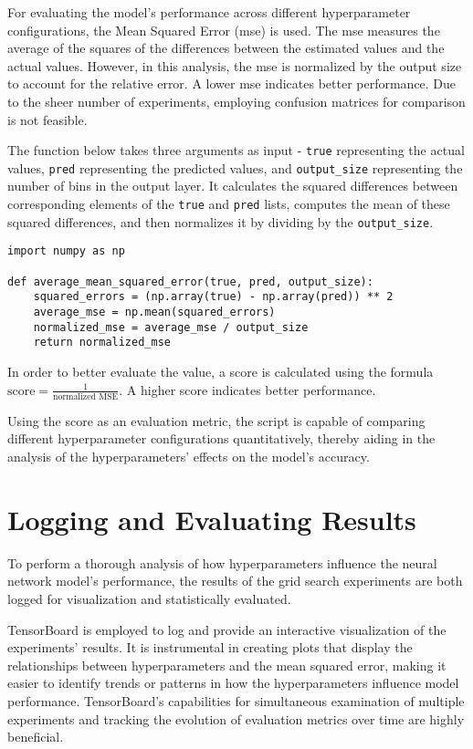 For evaluating the model's performance across different hyperparameter configurations, the Mean Squared Error (\ac{mse}) is used. The \ac{mse} measures the average of the squares of the differences between the estimated values and the actual values. However, in this analysis, the \ac{mse} is normalized by the output size to account for the relative error. A lower \ac{mse} indicates better performance. Due to the sheer number of experiments, employing confusion matrices for comparison is not feasible.

The function below takes three arguments as input - \verb|true| representing the actual values, \verb|pred| representing the predicted values, and \verb|output_size| representing the number of bins in the output layer. It calculates the squared differences between corresponding elements of the \verb|true| and \verb|pred| lists, computes the mean of these squared differences, and then normalizes it by dividing by the \verb|output_size|.

\begin{verbatim}
import numpy as np

def average_mean_squared_error(true, pred, output_size):
    squared_errors = (np.array(true) - np.array(pred)) ** 2
    average_mse = np.mean(squared_errors)
    normalized_mse = average_mse / output_size
    return normalized_mse
\end{verbatim}

In order to better evaluate the value, a score is calculated using the formula $\text{score} = \frac{1}{\text{normalized MSE}}$. A higher score indicates better performance.

Using the score as an evaluation metric, the script is capable of comparing different hyperparameter configurations quantitatively, thereby aiding in the analysis of the hyperparameters' effects on the model's accuracy.


\section{Logging and Evaluating Results}

To perform a thorough analysis of how hyperparameters influence the neural network model's performance, the results of the grid search experiments are both logged for visualization and statistically evaluated.

TensorBoard is employed to log and provide an interactive visualization of the experiments' results. It is instrumental in creating plots that display the relationships between hyperparameters and the mean squared error, making it easier to identify trends or patterns in how the hyperparameters influence model performance. TensorBoard's capabilities for simultaneous examination of multiple experiments and tracking the evolution of evaluation metrics over time are highly beneficial.

